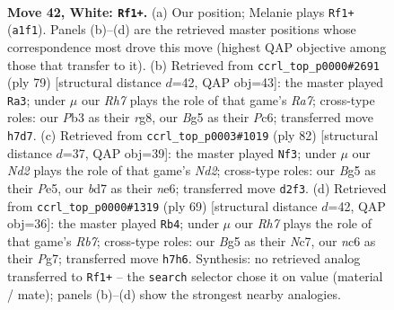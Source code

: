 \documentclass[11pt]{article}
\begin{document}
\clearpage

\begin{figure}[p]\centering
\begin{subfigure}{0.46\textwidth}\centering
\resizebox{\linewidth}{!}{%
\newchessgame
\chessboard[
  setfen={5kr1/3b3R/2n5/6B1/1p1p2P1/pP6/P1PN3K/R7 w - - 6 42},
  showmover=false,
  pgfstyle=straightmove, color=movearrow, markmove={a1-f1}
]}
\caption{}
\end{subfigure}\hfill
\begin{subfigure}{0.46\textwidth}\centering
\resizebox{\linewidth}{!}{%
\newchessgame
\chessboard[
  setfen={6R1/1pk5/p1p1n2p/2P1N2P/8/1P2KP1b/r3B3/8 b - - 4 40},
  showmover=false,
  pgfstyle=straightmove, color=movearrow, markmove={a2-a3}
]}
\caption{}
\end{subfigure}
\\[4pt]
\begin{subfigure}{0.46\textwidth}\centering
\resizebox{\linewidth}{!}{%
\newchessgame
\chessboard[
  setfen={8/2r1k3/R3n1p1/1r2P2p/3p1P1P/8/3N1P2/3R2K1 w - - 1 42},
  showmover=false,
  pgfstyle=straightmove, color=movearrow, markmove={d2-f3}
]}
\caption{}
\end{subfigure}\hfill
\begin{subfigure}{0.46\textwidth}\centering
\resizebox{\linewidth}{!}{%
\newchessgame
\chessboard[
  setfen={6k1/2n3p1/p3p2p/b3P2P/2R1N3/5NPK/Pr6/8 b - - 0 35},
  showmover=false,
  pgfstyle=straightmove, color=movearrow, markmove={b2-b4}
]}
\caption{}
\end{subfigure}
\caption{\textbf{Move 42, White: \texttt{Rf1+}.} (a) Our position; Melanie plays \texttt{Rf1+} (\texttt{a1f1}). Panels (b)--(d) are the retrieved master positions whose correspondence most drove this move (highest QAP objective among those that transfer to it). (b) Retrieved from \texttt{ccrl\_top\_p0000\#2691} (ply 79) [structural distance $d$=42, QAP obj=43]: the master played \texttt{Ra3}; under $\mu$ our \emph{Rh7} plays the role of that game's \emph{Ra7}; cross-type roles: our \emph{P}b3 as their \emph{r}g8, our \emph{B}g5 as their \emph{P}c6; transferred move \texttt{h7d7}. (c) Retrieved from \texttt{ccrl\_top\_p0003\#1019} (ply 82) [structural distance $d$=37, QAP obj=39]: the master played \texttt{Nf3}; under $\mu$ our \emph{Nd2} plays the role of that game's \emph{Nd2}; cross-type roles: our \emph{B}g5 as their \emph{P}e5, our \emph{b}d7 as their \emph{n}e6; transferred move \texttt{d2f3}. (d) Retrieved from \texttt{ccrl\_top\_p0000\#1319} (ply 69) [structural distance $d$=42, QAP obj=36]: the master played \texttt{Rb4}; under $\mu$ our \emph{Rh7} plays the role of that game's \emph{Rb7}; cross-type roles: our \emph{B}g5 as their \emph{N}c7, our \emph{n}c6 as their \emph{P}g7; transferred move \texttt{h7h6}. Synthesis: no retrieved analog transferred to \texttt{Rf1+} -- the \texttt{search} selector chose it on value (material / mate); panels (b)--(d) show the strongest nearby analogies.}
\label{fig:thought-m82}
\end{figure}
\end{document}
